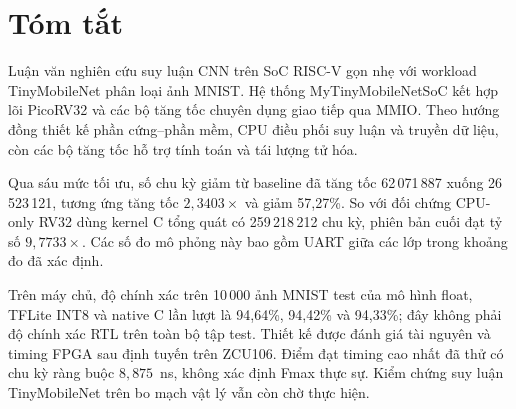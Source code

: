 \chapter*{Tóm tắt}
Luận văn nghiên cứu suy luận CNN trên SoC RISC-V gọn nhẹ với workload TinyMobileNet phân loại ảnh MNIST. Hệ thống MyTinyMobileNetSoC kết hợp lõi PicoRV32 và các bộ tăng tốc chuyên dụng giao tiếp qua MMIO. Theo hướng đồng thiết kế phần cứng--phần mềm, CPU điều phối suy luận và truyền dữ liệu, còn các bộ tăng tốc hỗ trợ tính toán và tái lượng tử hóa.

Qua sáu mức tối ưu, số chu kỳ giảm từ baseline đã tăng tốc 62\,071\,887 xuống 26\,523\,121, tương ứng tăng tốc $2{,}3403\times$ và giảm 57,27\%. So với đối chứng CPU-only RV32 dùng kernel C tổng quát có 259\,218\,212 chu kỳ, phiên bản cuối đạt tỷ số $9{,}7733\times$. Các số đo mô phỏng này bao gồm UART giữa các lớp trong khoảng đo đã xác định.

Trên máy chủ, độ chính xác trên 10\,000 ảnh MNIST test của mô hình float, TFLite INT8 và native C lần lượt là 94,64\%, 94,42\% và 94,33\%; đây không phải độ chính xác RTL trên toàn bộ tập test. Thiết kế được đánh giá tài nguyên và timing FPGA sau định tuyến trên ZCU106. Điểm đạt timing cao nhất đã thử có chu kỳ ràng buộc $8{,}875$~ns, không xác định Fmax thực sự. Kiểm chứng suy luận TinyMobileNet trên bo mạch vật lý vẫn còn chờ thực hiện.

